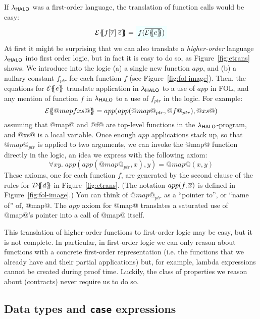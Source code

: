If $\lambda_{\sf HALO}$ was
a first-order language, the translation of function calls would be easy:
$$
\etrans{\Sigma}{\Gamma}{f[\ol{\tau}]\;\ol{e}} = \formula{f(\ol{\etrans{}{}{e}})} \\
$$
At first it might be surprising that we can also translate a \emph{higher-order} language
$\lambda_{\sf HALO}$ into first order logic, but in fact it is easy to do so, as
Figure~\ref{fig:etrans} shows.  We introduce into the logic
(a) a single new function $app$, and (b) a nullary constant $f_{ptr}$ for each function $f$
(see Figure~\ref{fig:fol-image}).
Then, the equations for ${\cal E}\{\!\!\{e\}\!\!\}$ translate application in $\lambda_{\sf HALO}$ to
a use of $app$ in FOL, and any mention of function $f$ in $\lambda_{\sf HALO}$ to a use
of $f_{ptr}$ in the logic.  For example:
$$
{\cal E}\{\!\!\{@map f xs@\}\!\!\} = app( app( @map@_{ptr}, @f@_{ptr}), @xs@)
$$
assuming that @map@ and @f@ are top-level functions in the $\lambda_{\sf HALO}$-program, and
@xs@ is a local variable.  Once enough $app$ applications stack up, so that
$@map@_{ptr}$ is applied to two arguments, we can invoke the @map@ function directly 
in the logic, an idea we express with the following axiom:
$$
\forall x y.\;app(app(@map@_{ptr}, x), y) = @map@(x,y)
$$
These axioms, one for each function $f$, are generated by the second
clause of the rules for ${\cal D}\{\!\!\{d\}\!\!\}$ in Figure~\ref{fig:etrans}.
(The notation $app(f,\overline{x})$ is defined in Figure~\ref{fig:fol-image}.)
You can think of $@map@_{ptr}$ as a ``pointer to'', or ``name of'' of, @map@.
The $app$ axiom for @map@ translates a saturated use of @map@'s pointer into
a call of @map@ itself.

This translation of higher-order functions to first-order logic may be
easy, but it is not complete. In particular, in first-order logic we
can only reason about functions with a concrete first-order
representation (i.e. the functions that we already have and their
partial applications) but, for example, lambda expressions cannot be
created during proof time. Luckily, the class of properties we reason
about (contracts) never require us to do so.

\subsection{Data types and {\tt case} expressions} \label{s:case-fol}

